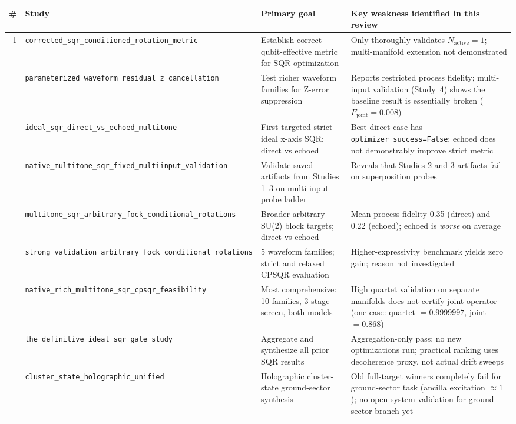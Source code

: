 \documentclass[11pt,letterpaper]{article}
\newcommand{\nact}{N_{\text{active}}}
\begin{document}
\begin{center}
\begin{tabular}{rp{4cm}p{3.5cm}p{5cm}}
\toprule
\# & Study & Primary goal & Key weakness identified in this review \\
\midrule
1 & \texttt{corrected\_sqr\_conditioned\_rotation\_metric} &
  Establish correct qubit-effective metric for SQR optimization &
  Only thoroughly validates $\nact=1$; multi-manifold extension not demonstrated \\
\addlinespace
2 & \texttt{parameterized\_waveform\_residual\_z\_cancellation} &
  Test richer waveform families for Z-error suppression &
  Reports restricted process fidelity; multi-input validation (Study~4) shows
  the baseline result is essentially broken ($F_\text{joint} = 0.008$) \\
\addlinespace
3 & \texttt{ideal\_sqr\_direct\_vs\_echoed\_multitone} &
  First targeted strict ideal x-axis SQR; direct vs echoed &
  Best direct case has \texttt{optimizer\_success=False}; echoed does not demonstrably improve strict metric \\
\addlinespace
4 & \texttt{native\_multitone\_sqr\_fixed\_multiinput\_validation} &
  Validate saved artifacts from Studies 1--3 on multi-input probe ladder &
  Reveals that Studies 2 and 3 artifacts fail on superposition probes \\
\addlinespace
5 & \texttt{multitone\_sqr\_arbitrary\_fock\_conditional\_rotations} &
  Broader arbitrary SU(2) block targets; direct vs echoed &
  Mean process fidelity 0.35 (direct) and 0.22 (echoed); echoed is \emph{worse} on average \\
\addlinespace
6 & \texttt{strong\_validation\_arbitrary\_fock\_conditional\_rotations} &
  5 waveform families; strict and relaxed CPSQR evaluation &
  Higher-expressivity benchmark yields zero gain; reason not investigated \\
\addlinespace
7 & \texttt{native\_rich\_multitone\_sqr\_cpsqr\_feasibility} &
  Most comprehensive: 10 families, 3-stage screen, both models &
  High quartet validation on separate manifolds does not certify joint operator
  (one case: quartet $= 0.9999997$, joint $= 0.868$) \\
\addlinespace
8 & \texttt{the\_definitive\_ideal\_sqr\_gate\_study} &
  Aggregate and synthesize all prior SQR results &
  Aggregation-only pass; no new optimizations run; practical ranking
  uses decoherence proxy, not actual drift sweeps \\
\addlinespace
9 & \texttt{cluster\_state\_holographic\_unified} &
  Holographic cluster-state ground-sector synthesis &
  Old full-target winners completely fail for ground-sector task (ancilla excitation $\approx 1$);
  no open-system validation for ground-sector branch yet \\
\bottomrule
\end{tabular}
\end{center}
\end{document}
